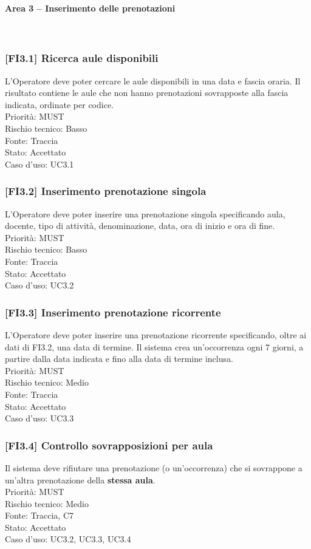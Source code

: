 \paragraph{Area 3 – Inserimento delle prenotazioni}~\\
\subsubsection{[FI3.1] Ricerca aule disponibili}
L'Operatore deve poter cercare le aule disponibili in una data e fascia oraria. Il risultato contiene le aule che non hanno prenotazioni sovrapposte alla fascia indicata, ordinate per codice.\\
Priorità: MUST\\Rischio tecnico: Basso\\Fonte: Traccia\\Stato: Accettato\\Caso d'uso: UC3.1

\subsubsection{[FI3.2] Inserimento prenotazione singola}
L'Operatore deve poter inserire una prenotazione singola specificando aula, docente, tipo di attività, denominazione, data, ora di inizio e ora di fine.\\
Priorità: MUST\\Rischio tecnico: Basso\\Fonte: Traccia\\Stato: Accettato\\Caso d'uso: UC3.2

\subsubsection{[FI3.3] Inserimento prenotazione ricorrente}
L'Operatore deve poter inserire una prenotazione ricorrente specificando, oltre ai dati di FI3.2, una data di termine. Il sistema crea un'occorrenza ogni 7 giorni, a partire dalla data indicata e fino alla data di termine inclusa.\\
Priorità: MUST\\Rischio tecnico: Medio\\Fonte: Traccia\\Stato: Accettato\\Caso d'uso: UC3.3

\subsubsection{[FI3.4] Controllo sovrapposizioni per aula}
Il sistema deve rifiutare una prenotazione (o un'occorrenza) che si sovrappone a un'altra prenotazione della \textbf{stessa aula}.\\
Priorità: MUST\\Rischio tecnico: Medio\\Fonte: Traccia, C7\\Stato: Accettato\\Caso d'uso: UC3.2, UC3.3, UC3.4


